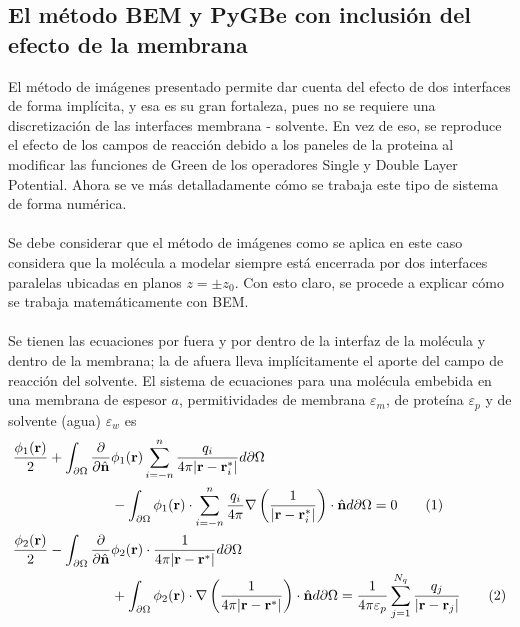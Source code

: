 \documentclass[12pt, oneside, numbers, spanish]{ezthesis}
\newcommand\numberthis{\addtocounter{equation}{1}\tag{\theequation}}
\numberwithin{equation}{section}
\begin{document}
\subsection{El método BEM y PyGBe con inclusión del efecto de la membrana}\label{subsec:BEM_PyGBE}
El método de imágenes presentado permite dar cuenta del efecto de dos interfaces de forma implícita, y esa es su gran fortaleza, pues no se requiere una discretización de las interfaces membrana - solvente. En vez de eso, se reproduce el efecto de los campos de reacción debido a los paneles de la proteina al modificar las funciones de Green de los operadores Single y Double Layer Potential. Ahora se ve más detalladamente cómo se trabaja este tipo de sistema de forma numérica.\\\\
Se debe considerar que el método de imágenes como se aplica en este caso considera que la molécula a modelar siempre está encerrada por dos interfaces paralelas ubicadas en planos $z = \pm z_0$. Con esto claro, se procede a explicar cómo se trabaja matemáticamente con BEM.\\\\
Se tienen las ecuaciones por fuera y por dentro de la interfaz de la molécula y dentro de la membrana; la de afuera lleva implícitamente el aporte del campo de reacción del solvente. El sistema de ecuaciones para una molécula embebida en una membrana de espesor $a$, permitividades de membrana $\varepsilon_m$, de proteína $\varepsilon_p$ y de solvente (agua) $\varepsilon_w$ es
\begin{align*}
\frac{\phi_1(\mathbf{r})}{2} + \int_{\partial\Omega}\frac{\partial}{\partial\hat{\mathbf{n}}}&\phi_1(\mathbf{r})\sum_{i=-n}^{n}\frac{q_i}{4\pi|\mathbf{r} - \mathbf{r}_i^*|} d\partial\Omega \\
& - \int_{\partial\Omega}\phi_1(\mathbf{r})\cdot\sum_{i = -n}^{n}\frac{q_i}{4\pi}\nabla\left(\frac{1}{|\mathbf{r} - \mathbf{r}_i^*|}\right)\cdot\hat{\mathbf{n}} d\partial\Omega = 0\numberthis \label{eqn:membrane1} \\
\frac{\phi_2(\mathbf{r})}{2} - \int_{\partial\Omega}\frac{\partial}{\partial\hat{\mathbf{n}}}&\phi_2(\mathbf{r})\cdot\frac{1}{4\pi|\mathbf{r} - \mathbf{r}^*|} d\partial\Omega \\
& + \int_{\partial\Omega}\phi_2(\mathbf{r})\cdot\nabla\left(\frac{1}{4\pi|\mathbf{r} - \mathbf{r}^*|}\right)\cdot\hat{\mathbf{n}} d\partial\Omega = \frac{1}{4\pi\varepsilon_p}\sum_{j = 1}^{N_q}\frac{q_j}{|\mathbf{r} - \mathbf{r}_j|} \numberthis \label{eqn:membrane2}
\end{align*}
\end{document}
